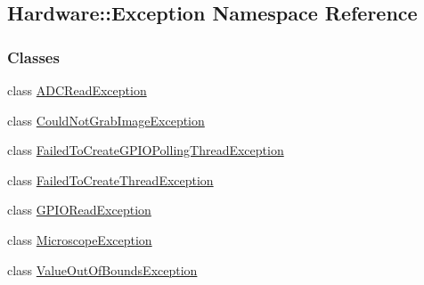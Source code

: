 \hypertarget{namespace_hardware_1_1_exception}{}\subsection{Hardware\+:\+:Exception Namespace Reference}
\label{namespace_hardware_1_1_exception}
\subsubsection*{Classes}
\begin{DoxyCompactItemize}
\item 
class \hyperlink{class_hardware_1_1_exception_1_1_a_d_c_read_exception}{A\+D\+C\+Read\+Exception}
\item 
class \hyperlink{class_hardware_1_1_exception_1_1_could_not_grab_image_exception}{Could\+Not\+Grab\+Image\+Exception}
\item 
class \hyperlink{class_hardware_1_1_exception_1_1_failed_to_create_g_p_i_o_polling_thread_exception}{Failed\+To\+Create\+G\+P\+I\+O\+Polling\+Thread\+Exception}
\item 
class \hyperlink{class_hardware_1_1_exception_1_1_failed_to_create_thread_exception}{Failed\+To\+Create\+Thread\+Exception}
\item 
class \hyperlink{class_hardware_1_1_exception_1_1_g_p_i_o_read_exception}{G\+P\+I\+O\+Read\+Exception}
\item 
class \hyperlink{class_hardware_1_1_exception_1_1_microscope_exception}{Microscope\+Exception}
\item 
class \hyperlink{class_hardware_1_1_exception_1_1_value_out_of_bounds_exception}{Value\+Out\+Of\+Bounds\+Exception}
\end{DoxyCompactItemize}
